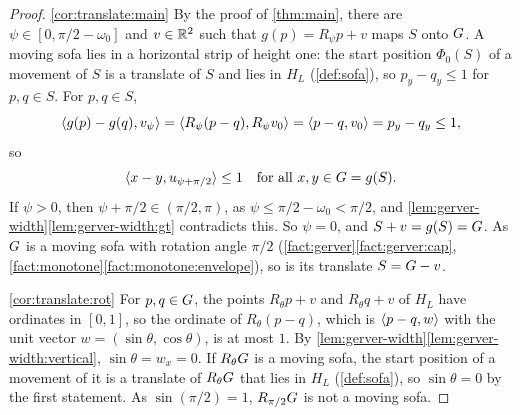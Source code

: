 \begin{proof}
\ref{cor:translate:main} By the proof of \cref{thm:main}, there are
$\psi\in[0,\pi/2-\omega_0]$ and $v\in\mathbb{R}^2$ such that $g(p)=R_\psi p+v$ maps $S$
onto $G$. A moving sofa lies in a horizontal strip of height one: the start
position $\Phi_0(S)$ of a movement of $S$ is a translate of $S$ and lies in
$H_L$ (\cref{def:sofa}), so $p_y-q_y\le1$ for $p,q\in S$. For $p,q\in S$,
\[
  \langle g(p)-g(q),v_\psi\rangle=\langle R_\psi(p-q),R_\psi v_0\rangle=\langle p-q,v_0\rangle=p_y-q_y
    \le1 ,
\]
so
\[
  \langle x-y,u_{\psi+\pi/2}\rangle\le1\quad\text{for all }x,y\in G=g(S).
\]
If $\psi>0$, then $\psi+\pi/2\in(\pi/2,\pi)$, as $\psi\le\pi/2-\omega_0<\pi/2$,
and \cref{lem:gerver-width}\ref{lem:gerver-width:gt} contradicts this. So
$\psi=0$, and $S+v=g(S)=G$. As $G$ is a moving sofa with rotation angle
$\pi/2$ (\cref{fact:gerver}\ref{fact:gerver:cap},
\cref{fact:monotone}\ref{fact:monotone:envelope}), so is its translate
$S=G-v$.

\ref{cor:translate:rot} For $p,q\in G$, the points $R_\theta p+v$ and $R_\theta
q+v$ of $H_L$ have ordinates in $[0,1]$, so the ordinate of $R_\theta(p-q)$,
which is $\langle p-q,w\rangle$ with the unit vector $w=(\sin\theta,\cos\theta)$, is at
most $1$. By \cref{lem:gerver-width}\ref{lem:gerver-width:vertical},
$\sin\theta=w_x=0$. If $R_\theta G$ is a moving sofa, the start position of a
movement of it is a translate of $R_\theta G$ that lies in $H_L$
(\cref{def:sofa}), so $\sin\theta=0$ by the first statement. As $\sin(\pi/2)=1$,
$R_{\pi/2}G$ is not a moving sofa.
\end{proof}
